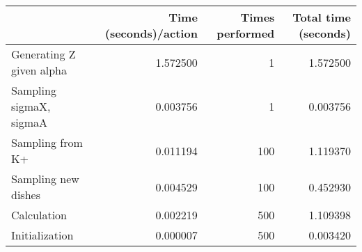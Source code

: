 \begin{tabular}{lrrr}
\toprule
{} &  Time (seconds)/action &  Times performed &  Total time (seconds) \\
\midrule
Generating Z given alpha &               1.572500 &                1 &              1.572500 \\
Sampling sigmaX, sigmaA  &               0.003756 &                1 &              0.003756 \\
Sampling from K+         &               0.011194 &              100 &              1.119370 \\
Sampling new dishes      &               0.004529 &              100 &              0.452930 \\
Calculation              &               0.002219 &              500 &              1.109398 \\
Initialization           &               0.000007 &              500 &              0.003420 \\
\bottomrule
\end{tabular}
